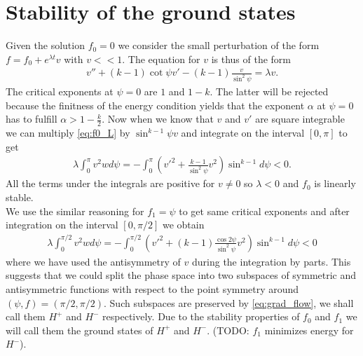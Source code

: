 \section*{Stability of the ground states}

Given the solution $f_0=0$ we consider the small perturbation of the
form $f=f_0+e^{\lambda t} v$ with $v<<1$. The equation for $v$ is thus
of the form
\begin{align}\label{eq:f0_L}
  v''+(k-1)\cot\psi v'-(k-1)\frac{v}{\sin^2\psi}=\lambda v.
\end{align}
The critical exponents at $\psi=0$ are $1$ and $1-k$. The latter will
be rejected because the finitness of the energy condition yields that
the exponent $\alpha$ at $\psi=0$ has to fulfill
$\alpha>1-\frac{k}{2}$. Now when we know that $v$ and $v'$ are square
integrable we can multiply \eqref{eq:f0_L} by $\sin^{k-1}\psi v$ and
integrate on the interval $[0,\pi]$ to get
\begin{align}
  \lambda\int_0^\pi v^2w d\psi=-\int_0^\pi\left(v'^2+\frac{k-1}{\sin^2\psi}v^2\right)\sin^{k-1}d\psi<0.
\end{align}
All the terms under the integrals are positive for $v\ne0$ so
$\lambda<0$ and $f_0$ is linearly stable.\\

We use the similar reasoning for $f_1=\psi$ to get same critical
exponents and after integration on the interval $[0,\pi/2]$ we obtain
\begin{align}
  \label{eq:f1_lambda}
  \lambda\int_0^{\pi/2} v^2w d\psi=-\int_0^{\pi/2}\left(v'^2+(k-1)\frac{\cos2\psi}{\sin^2\psi}v^2\right)\sin^{k-1}d\psi<0
\end{align}
where we have used the antisymmetry of $v$ during the integration by
parts. This suggests that we could split the phase space into two
subspaces of symmetric and antisymmetric functions with respect to the
point symmetry around $(\psi,f)=(\pi/2,\pi/2)$. Such subspaces are
preserved by \eqref{eq:grad_flow}, we shall call them $H^+$ and $H^-$
respectively. Due to the stability properties of $f_0$ and $f_1$ we
will call them the ground states of $H^+$ and $H^-$. (TODO: $f_1$
minimizes energy for $H^-$).


